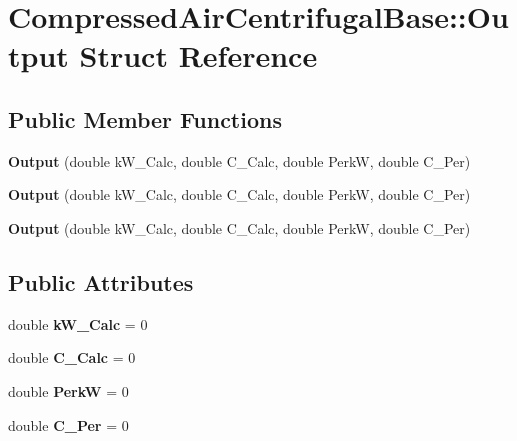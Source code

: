 \hypertarget{struct_compressed_air_centrifugal_base_1_1_output}{}\section{Compressed\+Air\+Centrifugal\+Base\+:\+:Output Struct Reference}
\label{struct_compressed_air_centrifugal_base_1_1_output}
\subsection*{Public Member Functions}
\begin{DoxyCompactItemize}
\item 
\mbox{\label{struct_compressed_air_centrifugal_base_1_1_output_af662048ddbe7125b3d8fefc8a36a59ab}} 
{\bfseries Output} (double k\+W\+\_\+\+Calc, double C\+\_\+\+Calc, double PerkW, double C\+\_\+\+Per)
\item 
\mbox{\label{struct_compressed_air_centrifugal_base_1_1_output_af662048ddbe7125b3d8fefc8a36a59ab}} 
{\bfseries Output} (double k\+W\+\_\+\+Calc, double C\+\_\+\+Calc, double PerkW, double C\+\_\+\+Per)
\item 
\mbox{\label{struct_compressed_air_centrifugal_base_1_1_output_af662048ddbe7125b3d8fefc8a36a59ab}} 
{\bfseries Output} (double k\+W\+\_\+\+Calc, double C\+\_\+\+Calc, double PerkW, double C\+\_\+\+Per)
\end{DoxyCompactItemize}
\subsection*{Public Attributes}
\begin{DoxyCompactItemize}
\item 
\mbox{\label{struct_compressed_air_centrifugal_base_1_1_output_adf7dd4c1de1abe3bb1e74528c6144f22}} 
double {\bfseries k\+W\+\_\+\+Calc} = 0
\item 
\mbox{\label{struct_compressed_air_centrifugal_base_1_1_output_a21604d882bf3345164eaa3bbc90723ff}} 
double {\bfseries C\+\_\+\+Calc} = 0
\item 
\mbox{\label{struct_compressed_air_centrifugal_base_1_1_output_aa17e30ef0f0a6045b49230ce9d3ad46e}} 
double {\bfseries PerkW} = 0
\item 
\mbox{\label{struct_compressed_air_centrifugal_base_1_1_output_afcf7794f74052865d2a6c0e2933b275f}} 
double {\bfseries C\+\_\+\+Per} = 0
\end{DoxyCompactItemize}


